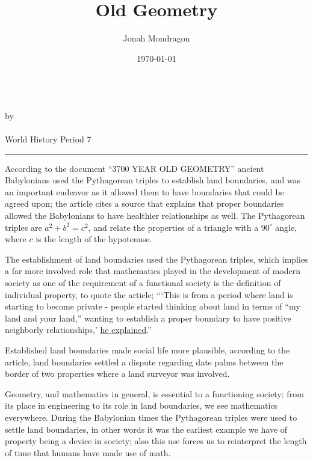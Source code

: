 \documentclass[12pt]{article}
\newcommand{\PutTitle}[1]
{
    \begin{center}
        {\huge\bfseries\thetitle}\\
        by \theauthor\\
        \thedate\\
        #1        
    \end{center}
    \hrule
    \vspace{2ex}
}
\begin{document}
\title{Old Geometry}
\author{Jonah Mondragon}
\date{\today}
\PutTitle{World History Period 7}

\doublespacing

According to the document ``3700 YEAR OLD GEOMETRY'' ancient Babylonians used
    the Pythagorean triples to establish land boundaries, and was an important
    endeavor as it allowed them to have boundaries that could be agreed upon;
    the article cites a source that explains that proper boundaries allowed
    the Babylonians to have healthier relationships as well.
The Pythagorean triples are $a^2 + b^2 = c^2$, and relate the properties of a
    triangle with a $90^{\circ}$ angle, where $c$ is the length of the
    hypotenuse.

The establishment of land boundaries used the Pythagorean triples, which implies
    a far more involved role that mathematics played in the development of
    modern society as one of the requirement of a functional society is the
    definition of individual property, to quote the article; 
    ```This is from a period where land is starting to become private - people
    started thinking about land in terms of ``my land and your land,'' wanting
    to establish a proper boundary to have positive neighborly relationships,'
    {\color{blue}\underline{\href{
    https://www.eurekalert.org/news-releases/923620} {he explained}}}.'' 

Established land boundaries made social life more plausible, according to the
    article, land boundaries settled a dispute regarding date palms between the
    border of two properties where a land surveyor was involved.

Geometry, and mathematics in general, is essential to a functioning society;
    from its place in engineering to its role in land boundaries, we see
    mathematics everywhere.
During the Babylonian times the Pythagorean triples were used to settle land
    boundaries, in other words it was the earliest example we have of property
    being a device in society; also this use forces us to reinterpret the length
    of time that humans have made use of math.
\end{document}
